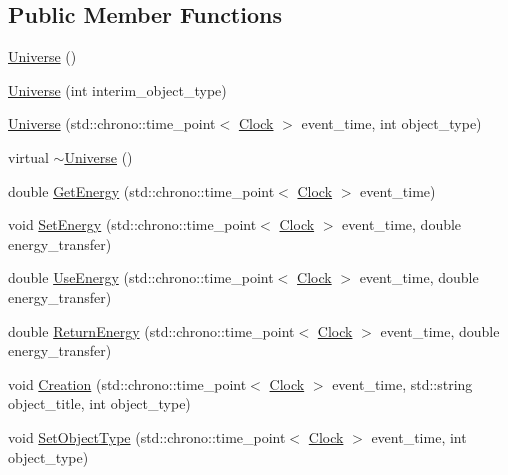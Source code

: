 \subsection*{Public Member Functions}
\begin{DoxyCompactItemize}
\item 
\hyperlink{class_universe_a4d137a146dd3c2514dfb692dfbab6984}{Universe} ()
\item 
\hyperlink{class_universe_a1210ce56049f1fc67f53aeda223bb82b}{Universe} (int interim\+\_\+object\+\_\+type)
\item 
\hyperlink{class_universe_a03af7455263d3028b55ca5dc93ebb6ba}{Universe} (std\+::chrono\+::time\+\_\+point$<$ \hyperlink{universe_8h_a0ef8d951d1ca5ab3cfaf7ab4c7a6fd80}{Clock} $>$ event\+\_\+time, int object\+\_\+type)
\item 
virtual \hyperlink{class_universe_ad4d90f6f2727992762c6b409d3d3d228}{$\sim$\+Universe} ()
\item 
double \hyperlink{class_universe_a3b25e7ce6552991b7d5e6a9eb6e8a7ff}{Get\+Energy} (std\+::chrono\+::time\+\_\+point$<$ \hyperlink{universe_8h_a0ef8d951d1ca5ab3cfaf7ab4c7a6fd80}{Clock} $>$ event\+\_\+time)
\item 
void \hyperlink{class_universe_a868250e67d0fcb2483aa8bdd73c40a02}{Set\+Energy} (std\+::chrono\+::time\+\_\+point$<$ \hyperlink{universe_8h_a0ef8d951d1ca5ab3cfaf7ab4c7a6fd80}{Clock} $>$ event\+\_\+time, double energy\+\_\+transfer)
\item 
double \hyperlink{class_universe_a63e878aaf03f1800b255e9a089a72a8b}{Use\+Energy} (std\+::chrono\+::time\+\_\+point$<$ \hyperlink{universe_8h_a0ef8d951d1ca5ab3cfaf7ab4c7a6fd80}{Clock} $>$ event\+\_\+time, double energy\+\_\+transfer)
\item 
double \hyperlink{class_universe_aeda74e3902c0e56c0c09779854045cde}{Return\+Energy} (std\+::chrono\+::time\+\_\+point$<$ \hyperlink{universe_8h_a0ef8d951d1ca5ab3cfaf7ab4c7a6fd80}{Clock} $>$ event\+\_\+time, double energy\+\_\+transfer)
\item 
void \hyperlink{class_universe_a28615baf47d4558cbe5eebeed6575024}{Creation} (std\+::chrono\+::time\+\_\+point$<$ \hyperlink{universe_8h_a0ef8d951d1ca5ab3cfaf7ab4c7a6fd80}{Clock} $>$ event\+\_\+time, std\+::string object\+\_\+title, int object\+\_\+type)
\item 
void \hyperlink{class_universe_a2274a54fbdc7504c897e4272162bf17a}{Set\+Object\+Type} (std\+::chrono\+::time\+\_\+point$<$ \hyperlink{universe_8h_a0ef8d951d1ca5ab3cfaf7ab4c7a6fd80}{Clock} $>$ event\+\_\+time, int object\+\_\+type)

\end{DoxyCompactItemize}
